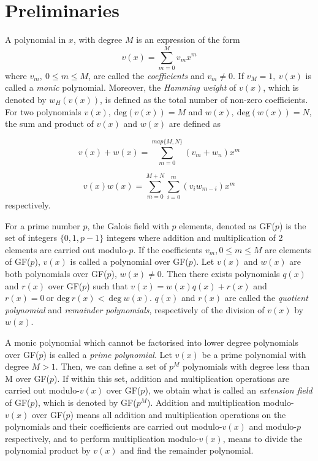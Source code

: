 \section{Preliminaries}
\label{secPrelim}

A polynomial in $x$, with degree $M$ is an expression of the form
\begin{equation*}
v(x) = \sum_{m=0}^{M} v_mx^m
\end{equation*}
where $v_m,~0 \leq m \leq M$, are called the \textit{coefficients}  and $v_m \neq 0$. If $v_M=1,~v(x)$ is called a \textit{monic} polynomial.
Moreover, the \textit{Hamming weight} of $v(x)$, which is denoted by $w_H(v(x))$, is defined as the total number of non-zero coefficients.
For two polynomials $v(x),~\text{deg}(v(x))=M$ and $w(x),~\text{deg}(w(x))=N$, the sum and product of $v(x)$ and $w(x)$ are defined as 

\begin{equation*}
v(x)+w(x)=\sum_{m=0}^{map\{ M,N\}} (v_m +w_n)x^m
\end{equation*}

\begin{equation*}
v(x)w(x)=\sum_{m=0}^{ M+N} \sum_{i=0}^{m} (v_i w_{m-i})x^m
\end{equation*}
 respectively.

For a prime number $p$, the Galois field with $p$ elements, denoted as GF($p$) is the set of integers $\{ 0,1,p-1\}$ integers where addition and multiplication of 2 elements are carried out modulo-$p$. If the coefficients $v_m, 0 \leq m \leq M$ are elements of GF($p$), $v(x)$ is called a polynomial over GF($p$). Let $v(x)$ and $w(x)$ are both polynomials over GF($p$), $w(x) \neq 0$. Then there exists polynomials $q(x)$ and $r(x)$ over GF($p$) such that $v(x) = w(x)q(x)+r(x)$ and $r(x)=0 ~\text{or deg}~r(x) < ~\text{deg}~w(x)$. $q(x)$ and $r(x)$ are called the \textit{quotient polynomial} and \textit{remainder polynomials}, respectively of the division of $v(x)$ by $w(x)$.

A monic polynomial which cannot be factorised into lower degree polynomials over GF($p$) is called a \textit{prime polynomial}.
Let $v(x)$ be a prime polynomial with degree $M>1$. Then, we can define a set of $p^M$ polynomials with degree less than M over GF($p$). If within this set, addition and multiplication operations are carried out modulo-$v(x)$ over GF($p$), we obtain what is called an \textit{extension field} of GF($p$), which is denoted by GF($p^M$). Addition and multiplication modulo-$v(x)$ over GF($p$) means all addition and multiplication operations on the polynomials and their coefficients are carried out modulo-$v(x)$ and modulo-$p$ respectively, and to perform multiplication modulo-$v(x)$, means to divide the polynomial product by $v(x)$ and find the remainder polynomial. 


